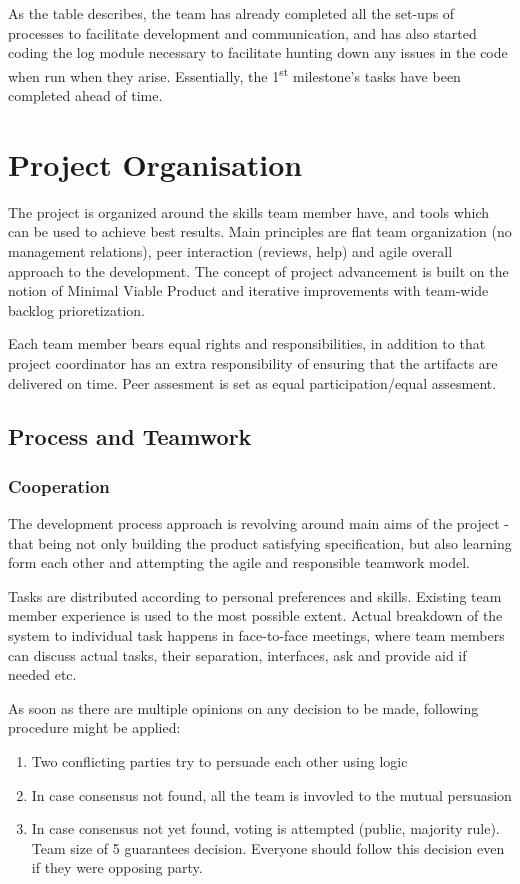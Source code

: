 As the table describes, the team has already completed all the set-ups of processes to facilitate development and communication, and has also started coding the log module necessary to facilitate hunting down any issues in the code when run when they arise. Essentially, the 1\textsuperscript{st} milestone's tasks have been completed ahead of time.

\section{Project Organisation} %
The project is organized around the skills team member have, and tools which can be used to achieve best results. Main
principles are flat team organization (no management relations), peer interaction (reviews, help) and agile overall
approach to the development. The concept of project advancement is built on the notion of Minimal Viable Product and
iterative improvements with team-wide backlog prioretization.

Each team member bears equal rights and responsibilities, in addition to that project coordinator has an extra responsibility
of ensuring that the artifacts are delivered on time. Peer assesment is set as equal participation/equal assesment.

\subsection{Process and Teamwork}
\subsubsection{Cooperation}
The development process approach is revolving around main aims of the project - that being not only building the product
satisfying specification, but also learning form each other and attempting the agile and responsible teamwork model.

Tasks are distributed according to personal preferences and skills. Existing team member experience is used to the most
possible extent. Actual breakdown of the system to individual task happens in face-to-face meetings, where team members
can discuss actual tasks, their separation, interfaces, ask and provide aid if needed etc.

As soon as there are multiple opinions on any decision to be made, following procedure might be applied:

\begin{enumerate}
    \item Two conflicting parties try to persuade each other using logic
    \item In case consensus not found, all the team is invovled to the mutual persuasion
    \item In case consensus not yet found, voting is attempted (public, majority rule). Team size of 5 guarantees decision.
        Everyone should follow this decision even if they were opposing party.
\end{enumerate}

